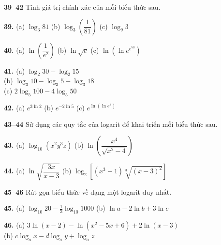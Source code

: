\begin{minipage}[t]{0.485\textwidth}
\fontsize{8.8pt}{11pt}\selectfont
\noindent
\textbf{\textsf{\color{stewartcyan}39--42}} Tính giá trị chính xác của mỗi biểu thức sau.

\vspace{0.4ex}
\noindent
\textbf{39.} (a) $\log_3 81$ \hfill (b) $\log_3\left(\dfrac{1}{81}\right)$ \hfill (c) $\log_9 3$\hspace*{2em}

\vspace{0.6ex}
\noindent
\textbf{40.} (a) $\ln \left(\dfrac{1}{e^2}\right)$ \hfill (b) $\ln\sqrt{e}$ \hfill (c) $\ln(\ln e^{e^{50}})$\hspace*{0.5em}

\vspace{0.6ex}
\noindent
\textbf{41.} (a) $\log_2 30 - \log_2 15$ \\[0.2ex]
(b) $\log_3 10 - \log_3 5 - \log_3 18$ \\[0.2ex]
(c) $2\log_5 100 - 4\log_5 50$

\vspace{0.6ex}
\noindent
\textbf{42.} (a) $e^{3\ln 2}$ \hfill (b) $e^{-2\ln 5}$ \hfill (c) $e^{\ln(\ln e^3)}$\hspace*{1.8em}

\vspace{1.2ex}
\noindent
\textbf{\textsf{\color{stewartcyan}43--44}} Sử dụng các quy tắc của logarit để khai triển mỗi biểu thức sau.

\vspace{0.4ex}
\noindent
\textbf{43.} (a) $\log_{10}(x^2 y^3 z)$ \hfill (b) $\ln\left(\dfrac{x^4}{\sqrt{x^2 - 4}}\right)$\hspace*{2em}

\vspace{0.8ex}
\noindent
\textbf{44.} (a) $\ln\sqrt{\dfrac{3x}{x-3}}$ \hfill (b) $\log_2\left[(x^3+1)\sqrt[3]{(x-3)^2}\right]$

\vspace{1.2ex}
\noindent
\textbf{\textsf{\color{stewartcyan}45--46}} Rút gọn biểu thức về dạng một logarit duy nhất.

\vspace{0.4ex}
\noindent
\textbf{45.} (a) $\log_{10} 20 - \frac{1}{3}\log_{10} 1000$ \hfill (b) $\ln a - 2\ln b + 3\ln c$

\vspace{0.6ex}
\noindent
\textbf{46.} (a) $3\ln(x-2) - \ln(x^2 - 5x + 6) + 2\ln(x-3)$ \\[0.2ex]
(b) $c\log_a x - d\log_a y + \log_a z$


\end{minipage}
